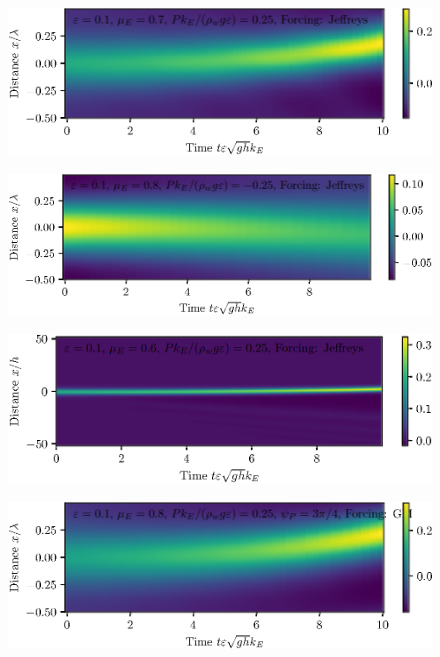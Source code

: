 \documentclass{jfm}
\begin{document}
\begin{figure}
  \centering
  \includegraphics{Spacetime-Mesh_double_mu.eps}
  \caption{}
\end{figure}

\begin{figure}
  \centering
  \includegraphics{Spacetime-Mesh_neg.eps}
  \caption{}
\end{figure}

\begin{figure}
  \centering
  \includegraphics{Spacetime-Mesh_solitary.eps}
  \caption{}
\end{figure}

\begin{figure}
  \centering
  \includegraphics{Spacetime-Mesh_GM.eps}
  \caption{}
\end{figure}
\end{document}
